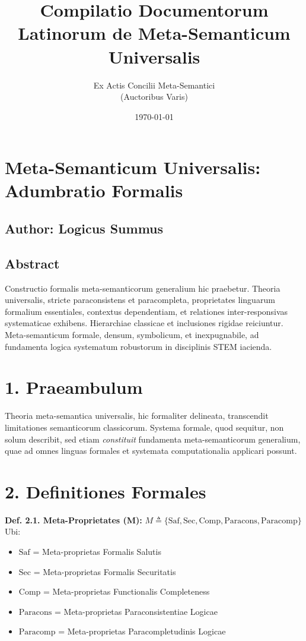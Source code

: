 \documentclass{article}
\title{Compilatio Documentorum Latinorum de Meta-Semanticum Universalis}
\author{Ex Actis Concilii Meta-Semantici\\ (Auctoribus Varis)}
\date{\today}
\begin{document}
	\maketitle

	\section{Meta-Semanticum Universalis: Adumbratio Formalis}
	\label{sec:adumbratio}

	\subsection*{Author: Logicus Summus}

	\subsection*{Abstract}
	Constructio formalis meta-semanticorum generalium hic praebetur. Theoria universalis, stricte paraconsistens et paracompleta, proprietates linguarum formalium essentiales, contextus dependentiam, et relationes inter-responsivas systematicae exhibens. Hierarchiae classicae et inclusiones rigidae reiciuntur. Meta-semanticum formale, densum, symbolicum, et inexpugnabile, ad fundamenta logica systematum robustorum in disciplinis STEM iacienda.

	\section*{1. Praeambulum}
	Theoria meta-semantica universalis, hic formaliter delineata, transcendit limitationes semanticorum classicorum. Systema formale, quod sequitur, non solum describit, sed etiam \textit{constituit} fundamenta meta-semanticorum generalium, quae ad omnes linguas formales et systemata computationalia applicari possunt.

	\section*{2. Definitiones Formales}
	\textbf{Def. 2.1. Meta-Proprietates (M):}
	$M \triangleq \{ \text{Saf}, \text{Sec}, \text{Comp}, \text{Paracons}, \text{Paracomp} \}$
	Ubi:
	\begin{itemize}
		\item $\text{Saf}$ = Meta-proprietas Formalis Salutis
		\item $\text{Sec}$ = Meta-proprietas Formalis Securitatis
		\item $\text{Comp}$ = Meta-proprietas Functionalis Completeness
		\item $\text{Paracons}$ = Meta-proprietas Paraconsistentiae Logicae
		\item $\text{Paracomp}$ = Meta-proprietas Paracompletudinis Logicae
	\end{itemize}
\end{document}
